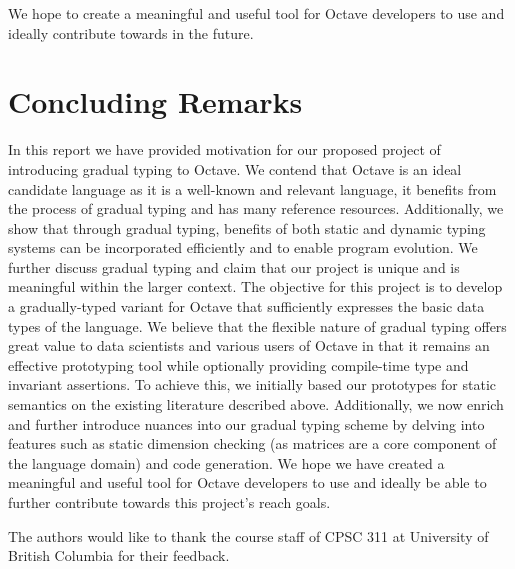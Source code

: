 We hope to create a meaningful and useful tool for Octave developers to use and ideally contribute towards in the future.

\section{Concluding Remarks}
In this report we have provided motivation for our proposed project of introducing gradual typing to Octave. We contend that Octave is an ideal candidate language as it is a well-known and relevant language, it benefits from the process of gradual typing and has many reference resources. Additionally, we show that through gradual typing, benefits of both static and dynamic typing systems can be incorporated efficiently and to enable program evolution. We further discuss gradual typing and claim that our project is unique and is meaningful within the larger context. The objective for this project is to develop a gradually-typed variant for Octave that sufficiently expresses the basic data types of the language. We believe that the flexible nature of gradual typing offers great value to data scientists and various users of Octave in that it remains an effective prototyping tool while optionally providing compile-time type and invariant assertions. To achieve this, we initially based our prototypes for static semantics on the existing literature described above. Additionally, we now enrich and further introduce nuances into our gradual typing scheme by delving into features such as static dimension checking (as matrices are a core component of the language domain) and code generation. We hope we have created a meaningful and useful tool for Octave developers to use and ideally be able to further contribute towards this project's reach goals.

\appendix

\begin{acks}
    The authors would like to thank the course staff of CPSC 311 at University
    of British Columbia for their feedback.
\end{acks}
